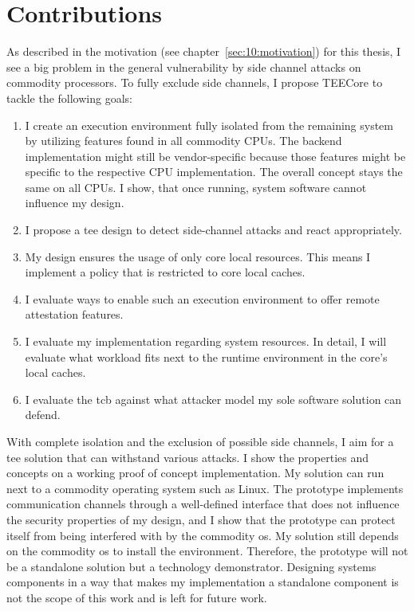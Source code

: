 \section{Contributions}
\label{sec:10:contributions}
As described in the motivation (see chapter~\ref{sec:10:motivation}) for this
thesis, I see a big problem in the general vulnerability by side channel
attacks on commodity processors. To fully exclude side channels, I propose
TEECore to tackle the following
goals:

\begin{enumerate}
    \item I create an execution environment fully isolated from the remaining
          system by utilizing features found in all commodity CPUs. The backend
          implementation might still be vendor-specific because those features
          might be specific to the respective CPU implementation. The overall
          concept stays the same on all CPUs. I show, that once running, system
          software cannot influence my design.
    \item I propose a \gls{tee} design to detect side-channel attacks and react
          appropriately.
    \item My design ensures the usage of only core local resources. This means
          I implement a policy that is restricted to core local caches.
    \item I evaluate ways to enable such an execution environment to offer
          remote attestation features.
    \item I evaluate my implementation regarding system resources. In detail,
          I will evaluate what workload fits next to the runtime
          environment in the core's local caches.
    \item I evaluate the \gls{tcb} against what attacker model my sole software
          solution can defend.
\end{enumerate}

With complete isolation and the exclusion of possible side channels, I aim for a
\gls{tee} solution that can withstand various attacks. I show the properties and
concepts on a working proof of concept implementation. My solution can run next
to a commodity operating system such as Linux. The prototype implements
communication channels through a well-defined interface that does not influence
the security properties of my design, and I show that the prototype can protect
itself from being interfered with by the commodity \gls{os}. My solution still
depends on the commodity \gls{os} to install the environment. Therefore, the
prototype will not be a standalone solution but a technology demonstrator.
Designing systems components in a way that makes my implementation a standalone
component is not the scope of this work and is left for future work.
